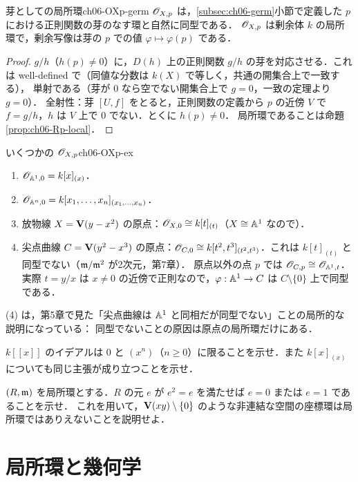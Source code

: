 \begin{myprop}{芽としての局所環}{ch06-OXp-germ}
$\mathscr{O}_{X,p}$ は，\ref{subsec:ch06-germ}小節で定義した $p$ における正則関数の芽のなす環と自然に同型である．
$\mathscr{O}_{X,p}$ は剰余体 $k$ の局所環で，剰余写像は芽の $p$ での値 $\varphi\mapsto\varphi(p)$ である．
\end{myprop}

\begin{proof}
$g/h$（$h(p)\neq0$）に，$D(h)$ 上の正則関数 $g/h$ の芽を対応させる．これは well-defined で（同値な分数は $k(X)$ で等しく，共通の開集合上で一致する），
単射である（芽が $0$ なら空でない開集合上で $g=0$，一致の定理より $g=0$）．
全射性：芽 $[U,f]$ をとると，正則関数の定義から $p$ の近傍 $V$ で $f=g/h$，$h$ は $V$ 上で $0$ でない．とくに $h(p)\neq0$．
局所環であることは命題 \ref{prop:ch06-Rp-local}．
\end{proof}

\begin{myex}{いくつかの $\mathscr{O}_{X,p}$}{ch06-OXp-ex}
\begin{enumerate}
  \item $\mathscr{O}_{\mathbb{A}^1,0}=k[x]_{(x)}$．
  \item $\mathscr{O}_{\mathbb{A}^n,0}=k[x_1,\dots,x_n]_{(x_1,\dots,x_n)}$．
  \item 放物線 $X=\mathbf{V}(y-x^2)$ の原点：$\mathscr{O}_{X,0}\cong k[t]_{(t)}$（$X\cong\mathbb{A}^1$ なので）．
  \item 尖点曲線 $C=\mathbf{V}(y^2-x^3)$ の原点：$\mathscr{O}_{C,0}\cong k[t^2,t^3]_{(t^2,t^3)}$．これは $k[t]_{(t)}$ と同型でない（$\mathfrak{m}/\mathfrak{m}^2$ が2次元，第7章）．
        原点以外の点 $p$ では $\mathscr{O}_{C,p}\cong\mathscr{O}_{\mathbb{A}^1,t}$．実際 $t=y/x$ は $x\neq0$ の近傍で正則なので，$\varphi:\mathbb{A}^1\to C$ は $C\setminus\{0\}$ 上で同型である．
\end{enumerate}
\end{myex}

(4) は，第5章で見た「尖点曲線は $\mathbb{A}^1$ と同相だが同型でない」ことの局所的な説明になっている：
同型でないことの原因は原点の局所環だけにある．

$k[[x]]$ のイデアルは $0$ と $(x^n)$（$n\ge0$）に限ることを示せ．また $k[x]_{(x)}$ についても同じ主張が成り立つことを示せ．

$(R,\mathfrak{m})$ を局所環とする．$R$ の元 $e$ が $e^2=e$ を満たせば $e=0$ または $e=1$ であることを示せ．
これを用いて，$\mathbf{V}(xy)\setminus\{0\}$ のような非連結な空間の座標環は局所環ではありえないことを説明せよ．

\section{局所環と幾何学}

